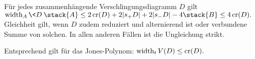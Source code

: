 \begin{st}
    Für jedes zusammenhängende Verschlingungsdiagramm $D$ gilt
    \begin{math}
        \width_A \<D\>
        \stack{A}\le 2 \Cr(D) + 2 |s_+ D| + 2|s_- D| - 4
        \stack{B}\le 4 \Cr(D).
    \end{math}
    Gleichheit gilt, wenn $D$ zudem reduziert und alternierend ist oder verbundene Summe von solchen.
    In allen anderen Fällen ist die Ungleichung strikt.

    Entsprechend gilt für das Jones-Polynom:
    \begin{math}
        \operatorname{width}_t V(D)
        \le \operatorname{cr}(D).
    \end{math}
\end{st}
